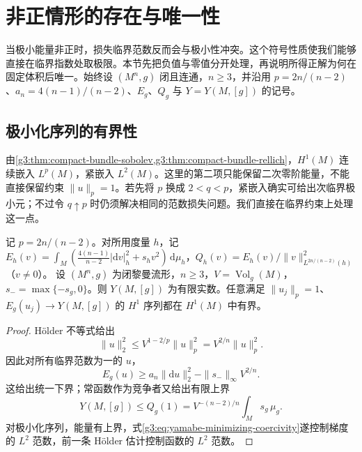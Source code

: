 
% 
% 

\section{非正情形的存在与唯一性}
\label{g3:sec:2403}

当极小能量非正时，损失临界范数反而会与极小性冲突。这个符号性质使我们能够直接在临界指数处取极限。本节先把负值与零值分开处理，再说明所得正解为何在固定体积后唯一。始终设 \((M^n,g)\) 闭且连通，\(n\ge3\)，并沿用 \(p=2n/(n-2)\)、\(a_n=4(n-1)/(n-2)\)、\(E_g\)、\(Q_g\) 与 \(Y=Y(M,[g])\) 的记号。

\subsection{极小化序列的有界性}
\label{g3:subsec:2403:01}
由\cref{g3:thm:compact-bundle-sobolev,g3:thm:compact-bundle-rellich}，\(H^1(M)\) 连续嵌入 \(L^p(M)\)，紧嵌入 \(L^2(M)\)。这里的第二项只能保留二次零阶能量，不能直接保留约束 \(\|u\|_p=1\)。若先将 \(p\) 换成 \(2<q<p\)，紧嵌入确实可给出次临界极小元；不过令 \(q\uparrow p\) 时仍须解决相同的范数损失问题。我们直接在临界约束上处理这一点。

\begin{lemma}\label{g3:lem:yamabe-minimizing-boundedness}
	记 \(p=2n/(n-2)\)。对所用度量 \(h\)，记 \(E_h(v)=\int_M(\tfrac{4(n-1)}{n-2}|\mathrm dv|_h^2+s_hv^2)\,\mathrm d\mu_h\)，\(Q_h(v)=E_h(v)/\|v\|_{L^{2n/(n-2)}(h)}^2\)（\(v\ne0\)）。
	设 \((M^n,g)\) 为闭黎曼流形，\(n\ge3\)，\(V=\operatorname{Vol}_g(M)\)，\(s_- =\max\{-s_g,0\}\)。则 \(Y(M,[g])\) 为有限实数。任意满足 \(\|u_j\|_p=1\)、\(E_g(u_j)\to Y(M,[g])\) 的 \(H^1\) 序列都在 \(H^1(M)\) 中有界。
\end{lemma}
\begin{proof}
	Hölder 不等式给出
	\[
		\|u\|_2^2\le V^{1-2/p}\|u\|_p^2
		=V^{2/n}\|u\|_p^2.
	\]
	因此对所有临界范数为一的 \(u\)，
	\begin{equation}\label{g3:eq:yamabe-minimizing-coercivity}
		E_g(u)\ge a_n\|\mathrm du\|_2^2
		-\|s_-\|_\infty V^{2/n}.
	\end{equation}
	这给出统一下界；常函数作为竞争者又给出有限上界
	\[
		Y(M,[g])\le Q_g(1)
		=V^{-(n-2)/n}\int_M s_g\,\mu_g.
	\]
	对极小化序列，能量有上界，式\eqref{g3:eq:yamabe-minimizing-coercivity}遂控制梯度的 \(L^2\) 范数，前一条 Hölder 估计控制函数的 \(L^2\) 范数。
\end{proof}

